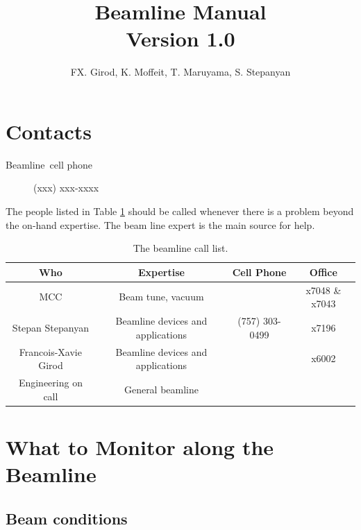 \documentclass[12pt]{article}
\newcommand{\versionnumber}{1.0}
\begin{document}
\title{Beamline Manual\\\normalsize Version \versionnumber}
\author{FX. Girod, K. Moffeit, T. Maruyama, S. Stepanyan}
\maketitle



\section{Contacts\label{beamline_contacts}}

\begin{description}
\item [Beamline~cell phone] (xxx) xxx-xxxx
\end{description}

The people listed in Table \ref{tab:calllist} should be called whenever there
is a problem beyond the on-hand expertise. The beam line expert is the main source for help.  
\begin{table}[tbhp]
\vspace{0.3cm}
{\centering \begin{tabular}{|c|c|c|c|}
\hline 
Who&Expertise&Cell Phone&Office\\
\hline 
\hline 
MCC&Beam tune, vacuum&&x7048 \& x7043\\
\hline 
Stepan Stepanyan&Beamline devices and applications&(757) 303-0499&x7196\\
\hline 
Francois-Xavie Girod&Beamline devices and applications&&x6002\\
\hline 
Engineering on call&General beamline&&\\
\hline 
\end{tabular}\par}
\vspace{0.3cm}


\caption{The beamline call list.\label{tab:calllist}}
\end{table} 



\section{What to Monitor along the Beamline}


\subsection{Beam conditions}
\end{document}
